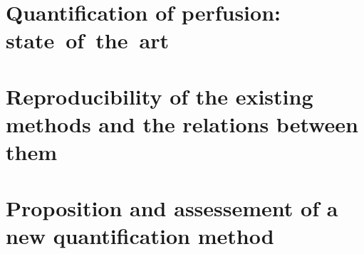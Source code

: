 \documentclass[12pt,vi,twoside]{mitthesis}
\begin{document}


\pagestyle{plain}


\pagestyle{fancyplain}
\addtolength{\headheight}{\baselineskip}
\renewcommand{\headrulewidth}{0.6pt}



\part{Quantification of perfusion: state~of~the~art}

\part{Reproducibility of the existing methods and the relations between them}

\part{Proposition and assessement of a new quantification method}



\clearpage
\appendix


%
%
%
\end{document}
